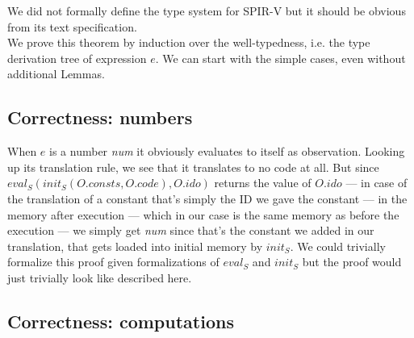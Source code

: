 \documentclass[letterpaper,12pt]{article}
\begin{document}
\begin{center}
\end{center}
\medskip

We did not formally define the type system for SPIR-V but it should
be obvious from its text specification. \\
We prove this theorem by induction over the well-typedness, i.e. the type
derivation tree of expression $e$. We can start with the simple
cases, even without additional Lemmas.

\subsection{Correctness: numbers}

When $e$ is a number \textit{num} it obviously evaluates to itself
as observation. Looking up its translation rule, we see that it translates
to no code at all. But since $eval_S(init_S(O.consts, O.code), O.ido)$
returns the value of $O.ido$ --- in case of the translation of a constant that's simply
the ID we gave the constant --- in the memory after execution --- which
in our case is the same memory as before the execution --- we simply
get \textit{num} since that's the constant we added in our translation,
that gets loaded into initial memory by $init_S$.
We could trivially formalize this proof given formalizations of 
$eval_S$ and $init_S$ but the proof would just trivially look like
described here.

\subsection{Correctness: computations}
\end{document}
